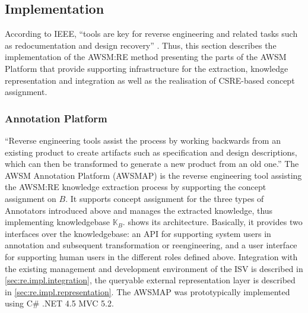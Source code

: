\hypertarget{implementation}{%
\subsection{Implementation}\label{implementation}}

According to IEEE, ``tools are key for reverse engineering and related tasks such as redocumentation and design recovery'' \autocite{SWEBOK2014}.
Thus, this section describes the implementation of the AWSM:RE method presenting the parts of the AWSM Platform that provide supporting infrastructure for the extraction, knowledge representation and integration as well as the realisation of CSRE-based concept assignment.

\hypertarget{sec:extraction.platform}{%
\subsubsection{Annotation Platform}\label{sec:extraction.platform}}

``Reverse engineering tools assist the process by working backwards from an existing product to create artifacts such as specification and design descriptions, which can then be transformed to generate a new product from an old one.'' \autocite{SWEBOK2014} The AWSM Annotation Platform (AWSMAP) is the reverse engineering tool assisting the AWSM:RE knowledge extraction process by supporting the concept assignment on \(B\).
It supports concept assignment for the three types of Annotators introduced above and manages the extracted knowledge, thus implementing knowledgebase \(\mathbb{K}_{B}\).
 shows its architecture.
Basically, it provides two interfaces over the knowledgebase: an API for supporting system users in annotation and subsequent transformation or reengineering, and a user interface for supporting human users in the different roles defined above.
Integration with the existing management and development environment of the ISV is described in \cref{sec:re.impl.integration}, the queryable external representation layer is described in \cref{sec:re.impl.representation}.
The AWSMAP was prototypically implemented using C\# .NET 4.5 MVC 5.2.

